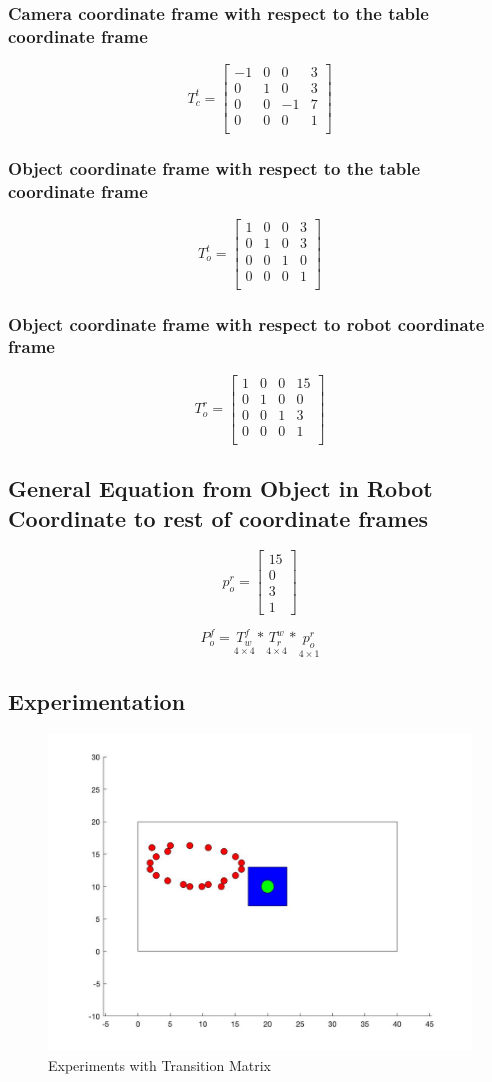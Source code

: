 \documentclass[11pt, oneside]{article}   	%
\begin{document}
\subsubsection{Camera coordinate frame with respect to the table coordinate frame}
$$
T_c^t =
\begin{bmatrix} 
-1 & 0 & 0 & 3 \\
0 & 1 & 0 & 3 \\
0 & 0 & -1 & 7 \\
0 & 0 & 0 & 1 \\
\end{bmatrix}
$$
\subsubsection{Object coordinate frame with respect to the table coordinate frame}
$$ T_o^t =
\begin{bmatrix} 
1 & 0 & 0 & 3 \\
0 & 1 & 0 & 3 \\
0 & 0 & 1 & 0 \\
0 & 0 & 0 & 1 \\
\end{bmatrix}
$$
\subsubsection{Object coordinate frame with respect to robot coordinate frame}
$$ T_o^r = 
\begin{bmatrix} 
1 & 0 & 0 & 15 \\
0 & 1 & 0 & 0 \\
0 & 0 & 1 & 3 \\
0 & 0 & 0 & 1 \\
\end{bmatrix}
$$

\subsection{General Equation from Object in Robot Coordinate to rest of coordinate frames}
$$
p_o^r = 
\begin{bmatrix}
15\\
0\\
3\\
1
\end{bmatrix}
$$

$$
P_o^f =  \underset{4\times4}{T_w^f} * \underset{4\times4}{T_r^w} * \underset{4\times1}{p_o^r}
$$

\subsection{Experimentation}
\begin{figure}[h]
   \centering
   \includegraphics[width=.5\textwidth]{../experiments.jpg} %
   \caption{Experiments with Transition Matrix}
   \label{fig:exp}
\end{figure}
\end{document}
